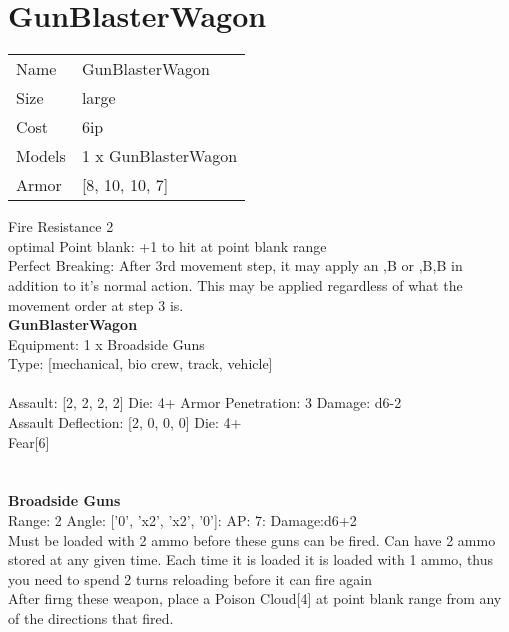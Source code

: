 \pagebreak\pagebreak

\section{ GunBlasterWagon }

\begin{tabular}{ll}
  Name & GunBlasterWagon \\
  Size & large\\
  Cost & 6ip\\
  Models & 1 x GunBlasterWagon\\
  Armor & [8, 10, 10, 7]\\
\end{tabular}

\noindent Fire Resistance 2\\ 
optimal Point blank: +1 to hit at point blank range\\ 
Perfect Breaking: After 3rd movement step, it may apply an ,B or ,B,B in addition to it's normal action. This may be applied regardless of what the movement order at step 3 is.\\ 


{\bf GunBlasterWagon } \\
Equipment: 1 x Broadside Guns \\
Type: [mechanical, bio crew, track, vehicle] \\
\ \\
Assault: [2, 2, 2, 2] Die: 4+ Armor Penetration: 3 Damage: d6-2 \\
Assault Deflection: [2, 0, 0, 0] Die: 4+\\
\indent Fear[6]\\ 
 
\ \\

\ \\
{\bf Broadside Guns } \\



Range: 2  Angle: ['0', 'x2', 'x2', '0']: AP: 7: Damage:d6+2 \\
Must be loaded with 2 ammo before these guns can be fired. Can have 2 ammo stored at any given time. Each time it is loaded it is loaded with 1 ammo, thus you need to spend 2 turns reloading before it can fire again\\ 
After firng these weapon, place a Poison Cloud[4] at point blank range from any of the directions that fired.\\ 




